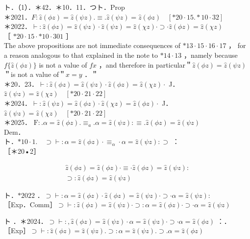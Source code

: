 \documentclass[10pt]{article}
\begin{document}
ト．（1）．＊42．＊10．11．つト．Prop\\
＊2021．$F: \hat{z}(\phi z)=\hat{z}(\psi z) . \equiv . \hat{z}(\psi z)=\hat{z}(\phi z) \quad[* 20 \cdot 15 . * 10 \cdot 32]$\\
＊2022．$\vdash: \hat{z}(\phi z)=\hat{z}(\psi z) \cdot \hat{z}(\psi z)=\hat{z}(\chi z) \cdot \supset \cdot \hat{z}(\phi z)=\hat{z}(\chi z)$\\
［ $* 20 \cdot 15 \cdot * 10 \cdot 301$ ］\\
The above propositions are not immediate consequences of $* 13 \cdot 15 \cdot 16 \cdot 17$ ， for a reason analogous to that explained in the note to $* 14 \cdot 13$ ，namely because $f\{\hat{z}(\phi z)\}$ is not a value of $f x$ ，and therefore in particular＂$\hat{z}(\phi z)=\hat{z}(\psi z)$＂is not a value of＂$x=y$ ．＂\\
＊20．23．$\vdash: \hat{z}(\phi z)=\hat{z}(\psi z) \cdot \hat{z}(\phi z)=\hat{z}(\chi z) \cdot$ J．$\hat{z}(\psi z)=\hat{z}(\chi z) \quad[* 20 \cdot 21 \cdot 22]$\\
＊2024．$\vdash: \hat{z}(\psi z)=\hat{z}(\phi z) \cdot \hat{z}(\chi z)=\hat{z}(\phi z) \cdot$ J．$\hat{z}(\psi z)=\hat{z}(\chi z) \quad[* 20 \cdot 21 \cdot 22]$\\
＊2025． $\mathrm{F}: . \alpha=\hat{z}(\phi z) . \equiv_{a} . \alpha=\hat{z}(\psi z): \equiv . \hat{z}(\phi z)=\hat{z}(\psi z)$\\
Dem．\\
ト．$* 10 \cdot 1 . \quad \supset \vdash: \alpha=\hat{z}(\phi z) \cdot \equiv_{\alpha} \cdot \alpha=\hat{z}(\psi z): \supset$ ：\\
［＊20•2］


\begin{gather*}
\hat{z}(\phi z)=\hat{z}(\phi z) \cdot \equiv \cdot \hat{z}(\phi z)=\hat{z}(\psi z): \\
\supset: \hat{z}(\phi z)=\hat{z}(\psi z) \tag{1}
\end{gather*}


ト．$* 2022$ ．$\supset \vdash: \alpha=\hat{z}(\phi z) \cdot \hat{z}(\phi z)=\hat{z}(\psi z) \cdot \supset \cdot \alpha=\hat{z}(\psi z):$\\
［Exp．Comm］$\supset \vdash: \hat{z}(\phi z)=\hat{z}(\psi z) \cdot \supset: \alpha=\hat{z}(\phi z) \cdot \supset \cdot \alpha=\hat{z}(\psi z)$

ト ．＊2024．$\supset \vdash:, \hat{z}(\phi z)=\hat{z}(\psi z) \cdot \alpha=\hat{z}(\psi z) \cdot \supset \cdot \alpha=\hat{z}(\phi z)$ ：．\\
［Exp］$\supset \vdash: \hat{z}(\phi z)=\hat{z}(\psi z) . \supset: \alpha=\hat{z}(\psi z) . \supset . \alpha=\hat{z}(\phi z)$
\end{document}
